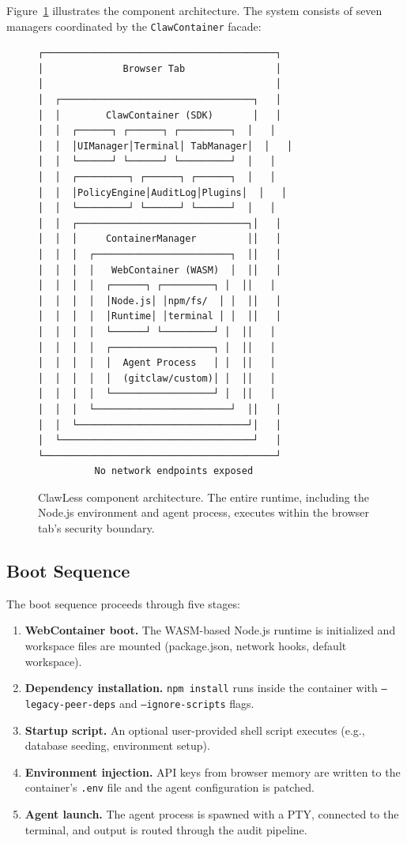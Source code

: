 \documentclass[11pt,twocolumn]{article}
\begin{document}
Figure~\ref{fig:arch} illustrates the component architecture. The system consists of seven managers coordinated by the \texttt{ClawContainer} facade:

\begin{figure}[H]
\centering
\small
\begin{verbatim}
┌─────────────────────────────────────────┐
│              Browser Tab                │
│                                         │
│  ┌──────────────────────────────────┐   │
│  │        ClawContainer (SDK)       │   │
│  │  ┌──────┐ ┌──────┐ ┌─────────┐  │   │
│  │  │UIManager│Terminal│ TabManager│  │   │
│  │  └──────┘ └──────┘ └─────────┘  │   │
│  │  ┌─────────┐ ┌──────┐ ┌──────┐  │   │
│  │  │PolicyEngine│AuditLog│Plugins│  │   │
│  │  └─────────┘ └──────┘ └──────┘  │   │
│  │  ┌──────────────────────────────┐│   │
│  │  │     ContainerManager         ││   │
│  │  │  ┌────────────────────────┐  ││   │
│  │  │  │   WebContainer (WASM)  │  ││   │
│  │  │  │  ┌──────┐ ┌─────────┐ │  ││   │
│  │  │  │  │Node.js│ │npm/fs/  │ │  ││   │
│  │  │  │  │Runtime│ │terminal │ │  ││   │
│  │  │  │  └──────┘ └─────────┘ │  ││   │
│  │  │  │  ┌──────────────────┐ │  ││   │
│  │  │  │  │  Agent Process   │ │  ││   │
│  │  │  │  │  (gitclaw/custom)│ │  ││   │
│  │  │  │  └──────────────────┘ │  ││   │
│  │  │  └────────────────────────┘  ││   │
│  │  └──────────────────────────────┘│   │
│  └──────────────────────────────────┘   │
└─────────────────────────────────────────┘
          No network endpoints exposed
\end{verbatim}
\caption{ClawLess component architecture. The entire runtime, including the Node.js environment and agent process, executes within the browser tab's security boundary.}
\label{fig:arch}
\end{figure}

\subsection{Boot Sequence}

The boot sequence proceeds through five stages:

\begin{enumerate}[noitemsep]
  \item \textbf{WebContainer boot.} The WASM-based Node.js runtime is initialized and workspace files are mounted (package.json, network hooks, default workspace).
  \item \textbf{Dependency installation.} \texttt{npm install} runs inside the container with \texttt{--legacy-peer-deps} and \texttt{--ignore-scripts} flags.
  \item \textbf{Startup script.} An optional user-provided shell script executes (e.g., database seeding, environment setup).
  \item \textbf{Environment injection.} API keys from browser memory are written to the container's \texttt{.env} file and the agent configuration is patched.
  \item \textbf{Agent launch.} The agent process is spawned with a PTY, connected to the terminal, and output is routed through the audit pipeline.
\end{enumerate}
\end{document}
